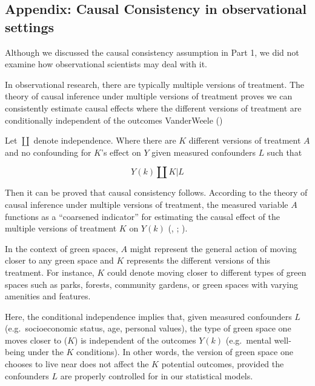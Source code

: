 \documentclass[
  singlecolumn]{article}
\begin{document}
\subsection{Appendix: Causal Consistency in observational
settings}\label{appendix-causal-consistency-in-observational-settings}

Although we discussed the causal consistency assumption in Part 1, we
did not examine how observational scientists may deal with it.

In observational research, there are typically multiple versions of
treatment. The theory of causal inference under multiple versions of
treatment proves we can consistently estimate causal effects where the
different versions of treatment are conditionally independent of the
outcomes VanderWeele ()

Let \(\coprod\) denote independence. Where there are \(K\) different
versions of treatment \(A\) and no confounding for \(K\)'s effect on
\(Y\) given measured confounders \(L\) such that

\[
Y(k) \coprod K | L
\]

Then it can be proved that causal consistency follows. According to the
theory of causal inference under multiple versions of treatment, the
measured variable \(A\) functions as a ``coarsened indicator'' for
estimating the causal effect of the multiple versions of treatment \(K\)
on \(Y(k)\) (,
;
).

In the context of green spaces, \(A\) might represent the general action
of moving closer to any green space and \(K\) represents the different
versions of this treatment. For instance, \(K\) could denote moving
closer to different types of green spaces such as parks, forests,
community gardens, or green spaces with varying amenities and features.

Here, the conditional independence implies that, given measured
confounders \(L\) (e.g.~socioeconomic status, age, personal values), the
type of green space one moves closer to (\(K\)) is independent of the
outcomes \(Y(k)\) (e.g.~mental well-being under the \(K\) conditions).
In other words, the version of green space one chooses to live near does
not affect the \(K\) potential outcomes, provided the confounders \(L\)
are properly controlled for in our statistical models.
\end{document}
